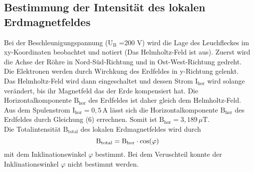  \subsection{Bestimmung der Intensität des lokalen Erdmagnetfeldes}
 Bei der Beschleunigungspannung ($\text{U}_\text{B}$ =200 V) wird die Lage des Leuchfleckes im xy-Koordinaten beobachtet und notiert (Das Helmholtz-Feld ist aus).
Zuerst wird die Achse der Röhre in Nord-Süd-Richtung und in Ost-West-Richtung gedreht. 
Die Elektronen werden durch Wirchkung des Erdfeldes in y-Richtung gelenkt.\\
 Das Helmholtz-Feld wird  dann eingeschaltet und dessen Strom $\text{I}_{\text{hor}}$ wird solange verändert, bis ihr Magnetfeld das der Erde kompensiert hat.
Die Horizontalkomponente $\text{B}_{\text{hor}}$ des Erdfeldes ist daher gleich dem Helmholtz-Feld.
Aus dem Spulenstrom $\text{I}_{\text{hor}}=0,5\, \text{A}$ lässt sich die Horizontalkomponente $\text{B}_{\text{hor}}$ des Erdfeldes durch Gleichung (6) errechnen.
Somit ist $\text{B}_{\text{hor}}=3,189 \,\mu \text{T}$.\\
Die Totalintensität $\text{B}_{\text{total}}$ des lokalen Erdmagnetfeldes wird durch
\begin{equation}
  \text{B}_{\text{total}}=\text{B}_{\text{hor}}\cdot \text{cos}(\varphi)\\
 \end{equation}
mit dem Inklinationswinkel $\varphi$ bestimmt.
Bei dem Veruschteil konnte der Inklinationswinkel $\varphi$ nicht bestimmt werden. 




